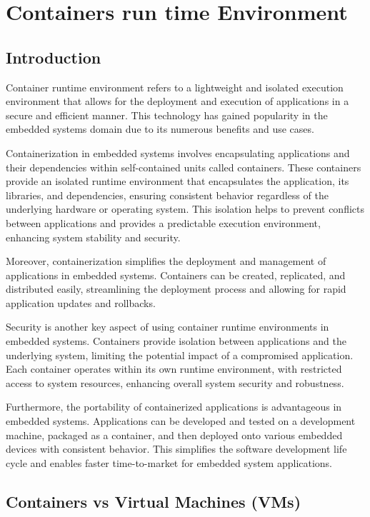 \documentclass[
12pt,
oneside, 
onehalfspacing, 
nolistspacing, 
parskip, 
chapterinoneline, 
]{AASTCOMPUTER}
\begin{document}
\chapter{Containers run time Environment}
\section{Introduction}
Container runtime environment refers to a lightweight and isolated execution environment that allows for the deployment and execution of applications in a secure and efficient manner. This technology has gained popularity in the embedded systems domain due to its numerous benefits and use cases.

Containerization in embedded systems involves encapsulating applications and their dependencies within self-contained units called containers. These containers provide an isolated runtime environment that encapsulates the application, its libraries, and dependencies, ensuring consistent behavior regardless of the underlying hardware or operating system. This isolation helps to prevent conflicts between applications and provides a predictable execution environment, enhancing system stability and security.

Moreover, containerization simplifies the deployment and management of applications in embedded systems. Containers can be created, replicated, and distributed easily, streamlining the deployment process and allowing for rapid application updates and rollbacks.

Security is another key aspect of using container runtime environments in embedded systems. Containers provide isolation between applications and the underlying system, limiting the potential impact of a compromised application. Each container operates within its own runtime environment, with restricted access to system resources, enhancing overall system security and robustness.

Furthermore, the portability of containerized applications is advantageous in embedded systems. Applications can be developed and tested on a development machine, packaged as a container, and then deployed onto various embedded devices with consistent behavior. This simplifies the software development life cycle and enables faster time-to-market for embedded system applications.

\section{Containers vs Virtual Machines (VMs)}
\end{document}
